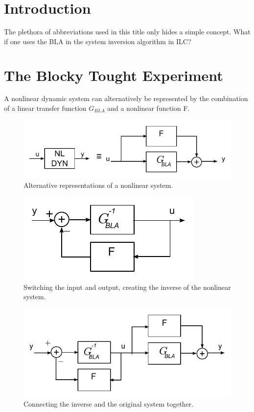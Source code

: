 %
%
\section{Introduction}

The plethora of abbreviations used in this title only hides a simple concept. What if one uses the BLA in the system inversion algorithm in ILC?

\section{The Blocky Tought Experiment}

		A nonlinear dynamic system can alternatively be represented by the combination of a linear transfer function $G_{BLA}$ and a nonlinear function F.
		\begin{figure}[hbtp]
			\centering
			\includegraphics[scale=0.7]{images/lego1}
			\caption{Alternative representations of a nonlinear system. }
		\end{figure}
	
		\begin{figure}[hbtp]
			\centering
			\includegraphics[scale=0.7]{images/lego2}
			\caption{Switching the input and output, creating the inverse of the nonlinear system. }
		\end{figure}

		\begin{figure}[hbtp]
			\centering
			\includegraphics[scale=0.7]{images/lego3}
			\caption{Connecting the inverse and the original system together. }
		\end{figure}

